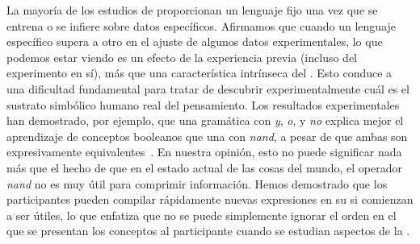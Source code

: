 La mayoría de los estudios de \lot proporcionan un lenguaje fijo una vez que se entrena o se infiere sobre datos específicos. Afirmamos que cuando un lenguaje específico supera a otro en el ajuste de algunos datos experimentales, lo que podemos estar viendo es un efecto de la experiencia previa (incluso del experimento en sí), más que una característica intrínseca del \lot. Esto conduce a una dificultad fundamental para tratar de descubrir experimentalmente cuál es el sustrato simbólico humano real del pensamiento. Los resultados experimentales han demostrado, por ejemplo, que una gramática con \textit{y}, \textit{o}, y \textit{no} explica mejor el aprendizaje de conceptos booleanos que una con \textit{nand}, a pesar de que ambas son expresivamente equivalentes~\cite{piantadosi2016logical}. En nuestra opinión, esto no puede significar nada más que el hecho de que en el estado actual de las cosas del mundo, el operador \textit{nand} no es muy útil para comprimir información. Hemos demostrado que los participantes pueden compilar rápidamente nuevas expresiones en su \lot si comienzan a ser útiles, lo que enfatiza que no se puede simplemente ignorar el orden en el que se presentan los conceptos al participante cuando se estudian aspectos de la \lot.

